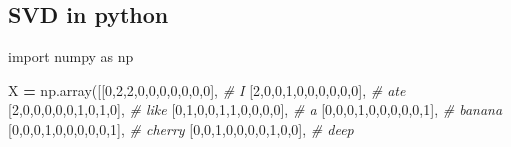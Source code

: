 \documentclass[
]{article}
\newenvironment{Shaded}{\begin{snugshade}}{\end{snugshade}}
\newcommand{\CommentTok}[1]{\textcolor[rgb]{0.56,0.35,0.01}{\textit{#1}}}
\newcommand{\DecValTok}[1]{\textcolor[rgb]{0.00,0.00,0.81}{#1}}
\newcommand{\ImportTok}[1]{#1}
\newcommand{\NormalTok}[1]{#1}
\newcommand{\OperatorTok}[1]{\textcolor[rgb]{0.81,0.36,0.00}{\textbf{#1}}}
\begin{document}
\hypertarget{svd-in-python}{%
\subsection{SVD in python}\label{svd-in-python}}

\begin{Shaded}
\begin{Highlighting}[]
\ImportTok{import}\NormalTok{ numpy }\ImportTok{as}\NormalTok{ np}

\NormalTok{X }\OperatorTok{=}\NormalTok{ np.array([[}\DecValTok{0}\NormalTok{,}\DecValTok{2}\NormalTok{,}\DecValTok{2}\NormalTok{,}\DecValTok{0}\NormalTok{,}\DecValTok{0}\NormalTok{,}\DecValTok{0}\NormalTok{,}\DecValTok{0}\NormalTok{,}\DecValTok{0}\NormalTok{,}\DecValTok{0}\NormalTok{,}\DecValTok{0}\NormalTok{], }\CommentTok{\# I}
\NormalTok{              [}\DecValTok{2}\NormalTok{,}\DecValTok{0}\NormalTok{,}\DecValTok{0}\NormalTok{,}\DecValTok{1}\NormalTok{,}\DecValTok{0}\NormalTok{,}\DecValTok{0}\NormalTok{,}\DecValTok{0}\NormalTok{,}\DecValTok{0}\NormalTok{,}\DecValTok{0}\NormalTok{,}\DecValTok{0}\NormalTok{], }\CommentTok{\# ate}
\NormalTok{              [}\DecValTok{2}\NormalTok{,}\DecValTok{0}\NormalTok{,}\DecValTok{0}\NormalTok{,}\DecValTok{0}\NormalTok{,}\DecValTok{0}\NormalTok{,}\DecValTok{0}\NormalTok{,}\DecValTok{1}\NormalTok{,}\DecValTok{0}\NormalTok{,}\DecValTok{1}\NormalTok{,}\DecValTok{0}\NormalTok{], }\CommentTok{\# like}
\NormalTok{              [}\DecValTok{0}\NormalTok{,}\DecValTok{1}\NormalTok{,}\DecValTok{0}\NormalTok{,}\DecValTok{0}\NormalTok{,}\DecValTok{1}\NormalTok{,}\DecValTok{1}\NormalTok{,}\DecValTok{0}\NormalTok{,}\DecValTok{0}\NormalTok{,}\DecValTok{0}\NormalTok{,}\DecValTok{0}\NormalTok{], }\CommentTok{\# a}
\NormalTok{              [}\DecValTok{0}\NormalTok{,}\DecValTok{0}\NormalTok{,}\DecValTok{0}\NormalTok{,}\DecValTok{1}\NormalTok{,}\DecValTok{0}\NormalTok{,}\DecValTok{0}\NormalTok{,}\DecValTok{0}\NormalTok{,}\DecValTok{0}\NormalTok{,}\DecValTok{0}\NormalTok{,}\DecValTok{1}\NormalTok{], }\CommentTok{\# banana}
\NormalTok{              [}\DecValTok{0}\NormalTok{,}\DecValTok{0}\NormalTok{,}\DecValTok{0}\NormalTok{,}\DecValTok{1}\NormalTok{,}\DecValTok{0}\NormalTok{,}\DecValTok{0}\NormalTok{,}\DecValTok{0}\NormalTok{,}\DecValTok{0}\NormalTok{,}\DecValTok{0}\NormalTok{,}\DecValTok{1}\NormalTok{], }\CommentTok{\# cherry}
\NormalTok{              [}\DecValTok{0}\NormalTok{,}\DecValTok{0}\NormalTok{,}\DecValTok{1}\NormalTok{,}\DecValTok{0}\NormalTok{,}\DecValTok{0}\NormalTok{,}\DecValTok{0}\NormalTok{,}\DecValTok{0}\NormalTok{,}\DecValTok{1}\NormalTok{,}\DecValTok{0}\NormalTok{,}\DecValTok{0}\NormalTok{], }\CommentTok{\# deep}

\end{Highlighting}
\end{Shaded}
\end{document}
